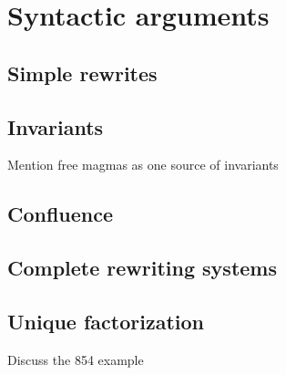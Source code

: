 
\section{Syntactic arguments}\label{syntactic-sec}


\subsection{Simple rewrites}\label{rewrite-sec}


\subsection{Invariants}

Mention free magmas as one source of invariants

\subsection{Confluence}

\subsection{Complete rewriting systems}

\subsection{Unique factorization}

Discuss the 854 example
